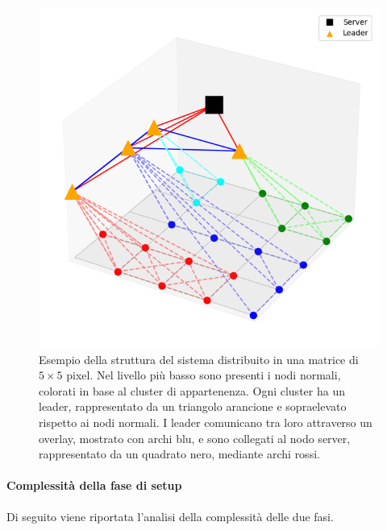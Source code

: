 \documentclass[12pt, a4paper]{report}
\begin{document}
\begin{figure}
    \centering
    \includegraphics[width=0.5\linewidth]{images/setup/Esempio_Grafo_G.png}
    \caption{Esempio della struttura del sistema distribuito in una matrice di $5\times5$ pixel. Nel livello pi\`u basso sono presenti i nodi normali, colorati in base al cluster di appartenenza. Ogni cluster ha un leader, rappresentato da un triangolo arancione e sopraelevato rispetto ai nodi normali. I leader comunicano tra loro attraverso un overlay, mostrato con archi blu, e sono collegati al nodo server, rappresentato da un quadrato nero, mediante archi rossi.}
    \label{fig:enter-label}
\end{figure}

\paragraph{Complessit\`a della fase di setup}\label{par:complessita_setup}

Di seguito viene riportata l'analisi della complessit\`a delle due fasi.
\end{document}
